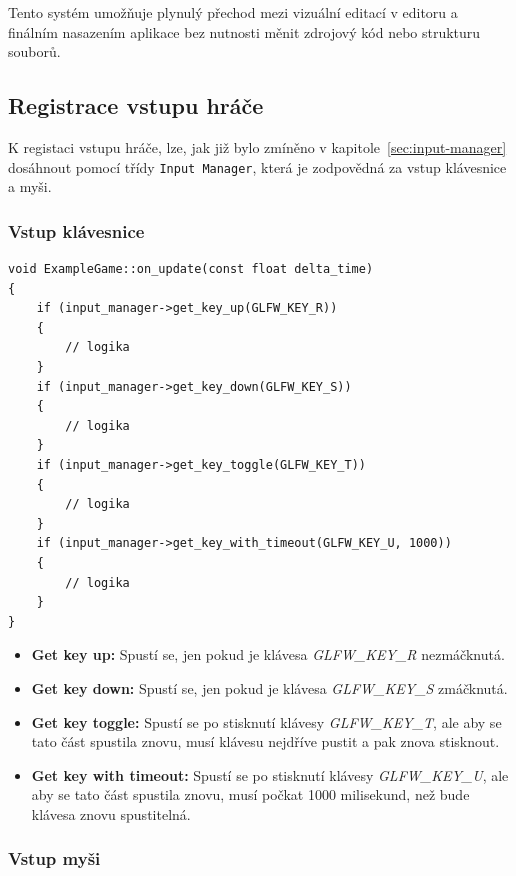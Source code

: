 \documentclass[12pt,a4paper]{article}
\begin{document}
Tento systém umožňuje plynulý přechod mezi vizuální editací v editoru a finálním nasazením aplikace bez nutnosti měnit zdrojový kód nebo strukturu souborů.



\subsection{Registrace vstupu hráče}
K registaci vstupu hráče, lze, jak již bylo zmíněno v kapitole~\ref{sec:input-manager} dosáhnout pomocí třídy \texttt{Input Manager}, která je zodpovědná za vstup klávesnice a myši.

\subsubsection{Vstup klávesnice}

\begin{lstlisting}[caption={Ukázkové získání vstupu klávesnice}]
void ExampleGame::on_update(const float delta_time)
{
    if (input_manager->get_key_up(GLFW_KEY_R))
    {
        // logika
    }
    if (input_manager->get_key_down(GLFW_KEY_S))
    {
        // logika
    }
    if (input_manager->get_key_toggle(GLFW_KEY_T))
    {
        // logika
    }
    if (input_manager->get_key_with_timeout(GLFW_KEY_U, 1000))
    {
        // logika
    }
}
\end{lstlisting}

\begin{itemize}
    \item \textbf{Get key up:} Spustí se, jen pokud je klávesa \textit{GLFW\_KEY\_R} nezmáčknutá.
    
    \item \textbf{Get key down:} Spustí se, jen pokud je klávesa \textit{GLFW\_KEY\_S} zmáčknutá.
    
    \item \textbf{Get key toggle:} Spustí se po stisknutí klávesy \textit{GLFW\_KEY\_T}, ale aby se tato část spustila znovu, musí klávesu nejdříve pustit a pak znova stisknout.

    \item \textbf{Get key with timeout:} Spustí se po stisknutí klávesy \textit{GLFW\_KEY\_U}, ale aby se tato část spustila znovu, musí počkat 1000 milisekund, než bude klávesa znovu spustitelná.
\end{itemize}

\subsubsection{Vstup myši}
\end{document}
